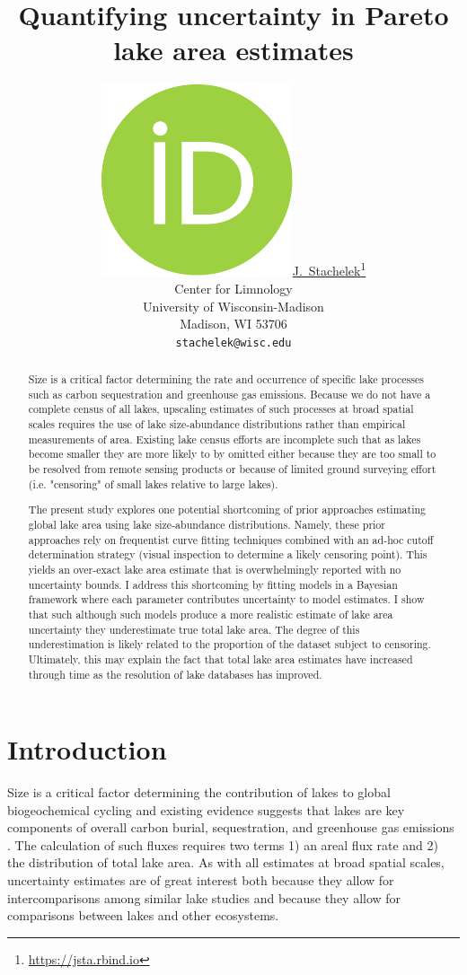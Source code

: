 \documentclass{article}
\title{Quantifying uncertainty in Pareto lake area estimates}
\author{ \href{https://orcid.org/0000-0002-5924-2464}{\includegraphics[scale=0.06]{orcid.pdf}\hspace{1mm}J.~Stachelek}\thanks{\href{https://jsta.rbind.io}{https://jsta.rbind.io}} \\
	Center for Limnology\\
	University of Wisconsin-Madison\\
	Madison, WI 53706 \\
	\texttt{stachelek@wisc.edu} \\
}
\begin{document}
\maketitle

\begin{abstract}
	Size is a critical factor determining the rate and occurrence of specific lake processes such as carbon sequestration and greenhouse gas emissions. Because we do not have a complete census of all lakes, upscaling estimates of such processes at broad spatial scales requires the use of lake size-abundance distributions rather than empirical measurements of area. Existing lake census efforts are incomplete such that as lakes become smaller they are more likely to by omitted either because they are too small to be resolved from remote sensing products or because of limited ground surveying effort (i.e. "censoring" of small lakes relative to large lakes).

The present study explores one potential shortcoming of prior approaches estimating global lake area using lake size-abundance distributions. Namely, these prior approaches rely on frequentist curve fitting techniques combined with an ad-hoc cutoff determination strategy (visual inspection to determine a likely censoring point). This yields an over-exact lake area estimate that is overwhelmingly reported with no uncertainty bounds. I address this shortcoming by fitting models in a Bayesian framework where each parameter contributes uncertainty to model estimates. I show that such although such models produce a more realistic estimate of lake area uncertainty they underestimate true total lake area. The degree of this underestimation is likely related to the proportion of the dataset subject to censoring. Ultimately, this may explain the fact that total lake area estimates have increased through time as the resolution of lake databases has improved.
\end{abstract}

\section{Introduction}
Size is a critical factor determining the contribution of lakes to global biogeochemical cycling and existing evidence suggests that lakes are key components of overall carbon burial, sequestration, and greenhouse gas emissions \citep{delsontroGreenhouseGasEmissions2018, kellerGlobalCarbonBudget2021}. The calculation of such fluxes requires two terms 1) an areal flux rate and 2) the distribution of total lake area. As with all estimates at broad spatial scales, uncertainty estimates are of great interest both because they allow for intercomparisons among similar lake studies and because they allow for comparisons between lakes and other ecosystems.
\end{document}

